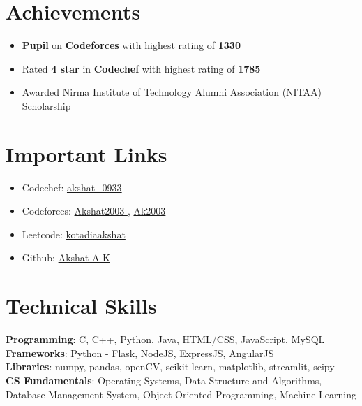\documentclass[letterpaper,11pt]{article}
\newcommand{\resumeItem}[1]{
  \item\small{
	{#1 \vspace{-2pt}}
  }
}
\newcommand{\resumeItemListStart}{\begin{itemize}}
\newcommand{\resumeItemListEnd}{\end{itemize}\vspace{-5pt}}
\begin{document}
\section{Achievements}
 \begin{itemize}[leftmargin=0.15in, label={}]
	\resumeItemListStart
    	\resumeItem{\textbf{Pupil} on \textbf{Codeforces} with highest rating of \textbf{1330}}
    	\resumeItem{Rated \textbf{4 star} in \textbf{Codechef} with highest rating of \textbf{1785} }
            \resumeItem{Awarded Nirma Institute of Technology Alumni Association (NITAA) Scholarship}
  	\resumeItemListEnd
 \end{itemize}
 \vspace{-16pt}
 
\section{Important Links}
 \begin{itemize}[leftmargin=0.15in, label={}]
	\resumeItemListStart
    	\resumeItem {{Codechef: }\href{https://www.codechef.com/users/akshat_0933}{ akshat\_0933 }}
    	\resumeItem {{Codeforces: }\href{https://codeforces.com/profile/Akshat2003}{ Akshat2003 }{ , }{\href{https://codeforces.com/profile/Ak2003}{Ak2003}}}
    	\resumeItem {{Leetcode: }\href{https://leetcode.com/kotadiaakshat/}{kotadiaakshat}}
            \resumeItem {{Github: }\href{https://github.com/Akshat-A-K/}{Akshat-A-K}}
  	\resumeItemListEnd
 \end{itemize}
 \vspace{-16pt}

%
\section{Technical Skills}
 \begin{itemize}[leftmargin=0.15in, label={}]
	\small{\item{
 	\textbf{Programming}{: C, C++, Python, Java, HTML/CSS, JavaScript, MySQL} \\
 	\textbf{Frameworks}{: Python - Flask, NodeJS, ExpressJS, AngularJS} \\
    \textbf{Libraries}{: numpy, pandas, openCV, scikit-learn, matplotlib, streamlit, scipy}\\
    \textbf{CS Fundamentals}{: Operating Systems, Data Structure and Algorithms, Database Management System, Object Oriented Programming, Machine Learning}
	}}
 \end{itemize}
 \vspace{-16pt}
\end{document}
